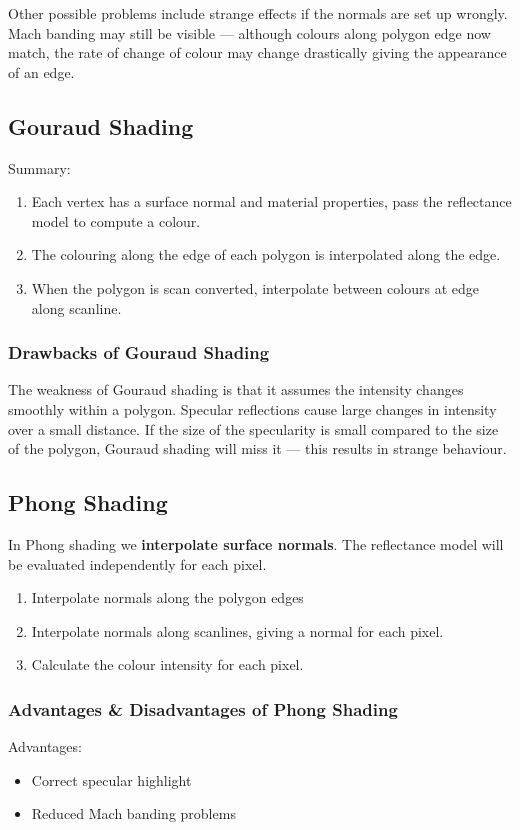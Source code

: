 \documentclass{article}
\begin{document}
Other possible problems include strange effects if the normals are set up wrongly.
Mach banding may still be visible --- although colours along polygon edge now match, the rate of change of colour may change drastically giving the appearance of an edge.

\subsection{Gouraud Shading}
Summary:
\begin{enumerate}
	\item Each vertex has a surface normal and material properties, pass the reflectance model to compute a colour.
	\item The colouring along the edge of each polygon is interpolated along the edge.
	\item When the polygon is scan converted, interpolate between colours at edge along scanline.
\end{enumerate}

\subsubsection{Drawbacks of Gouraud Shading}
The weakness of Gouraud shading is that it assumes the intensity changes smoothly within a polygon.
Specular reflections cause large changes in intensity over a small distance.
If the size of the specularity is small compared to the size of the polygon, Gouraud shading will miss it --- this results in strange behaviour.

\subsection{Phong Shading}
In Phong shading we \textbf{interpolate surface normals}.
The reflectance model will be evaluated independently for each pixel.
\begin{enumerate}
	\item Interpolate normals along the polygon edges
	\item Interpolate normals along scanlines, giving a normal for each pixel.
	\item Calculate the colour intensity for each pixel.
\end{enumerate}

\subsubsection{Advantages \& Disadvantages of Phong Shading}
Advantages:
\begin{itemize}
	\item Correct specular highlight
	\item Reduced Mach banding problems
\end{itemize}
\end{document}
